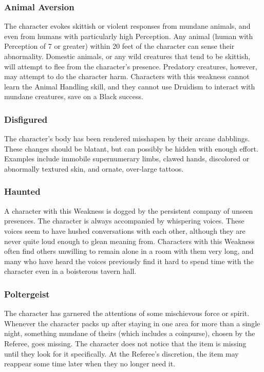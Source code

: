 \documentclass[oneside]{book}
\begin{document}
\begin{multicols}{2}
\subsubsection{Animal Aversion}
The character evokes skittish or violent responses from mundane animals, and even from humans with particularly high Perception. Any animal (human with Perception of 7 or greater) within 20 feet of the character can sense their abnormality. Domestic animals, or any wild creatures that tend to be skittish, will attempt to flee from the character's presence. Predatory creatures, however, may attempt to do the character harm. Characters with this weakness cannot learn the Animal Handling skill, and they cannot use Druidism to interact with mundane creatures, save on a Black success. 

\subsubsection{Disfigured}
The character's body has been rendered misshapen by their arcane dabblings. These changes should be blatant, but can possibly be hidden with enough effort. Examples include immobile supernumerary limbs, clawed hands, discolored or abnormally textured skin, and ornate, over-large tattoos. 

\subsubsection{Haunted}
A character with this Weakness is dogged by the persistent company of unseen presences. The character is always accompanied by whispering voices. These voices seem to have hushed conversations with each other, although they are never quite loud enough to glean meaning from. Characters with this Weakness often find others unwilling to remain alone in a room with them very long, and many who have heard the voices previously find it hard to spend time with the character even in a boisterous tavern hall.  

\subsubsection{Poltergeist}
The character has garnered the attentions of some mischievous force or spirit. Whenever the character packs up after staying in one area for more than a single night, something mundane of theirs (which includes a coinpurse), chosen by the Referee, goes missing. The character does not notice that the item is missing until they look for it specifically. At the Referee's discretion, the item may reappear some time later when they no longer need it. 


\end{multicols}
\end{document}
